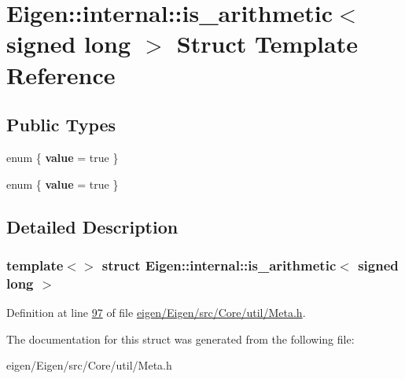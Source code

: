 \hypertarget{struct_eigen_1_1internal_1_1is__arithmetic_3_01signed_01long_01_4}{}\section{Eigen\+:\+:internal\+:\+:is\+\_\+arithmetic$<$ signed long $>$ Struct Template Reference}
\label{struct_eigen_1_1internal_1_1is__arithmetic_3_01signed_01long_01_4}
\subsection*{Public Types}
\begin{DoxyCompactItemize}
\item 
\mbox{\label{struct_eigen_1_1internal_1_1is__arithmetic_3_01signed_01long_01_4_ace7265d9306f9e416bf23e73bdb544b1}} 
enum \{ {\bfseries value} = true
 \}
\item 
\mbox{\label{struct_eigen_1_1internal_1_1is__arithmetic_3_01signed_01long_01_4_aea34172a88b83f95b47157a27bdc2838}} 
enum \{ {\bfseries value} = true
 \}
\end{DoxyCompactItemize}


\subsection{Detailed Description}
\subsubsection*{template$<$$>$\newline
struct Eigen\+::internal\+::is\+\_\+arithmetic$<$ signed long $>$}



Definition at line \hyperlink{eigen_2_eigen_2src_2_core_2util_2_meta_8h_source_l00097}{97} of file \hyperlink{eigen_2_eigen_2src_2_core_2util_2_meta_8h_source}{eigen/\+Eigen/src/\+Core/util/\+Meta.\+h}.



The documentation for this struct was generated from the following file\+:\begin{DoxyCompactItemize}
\item 
eigen/\+Eigen/src/\+Core/util/\+Meta.\+h\end{DoxyCompactItemize}
